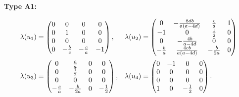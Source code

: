 \documentclass{amsart}
\theoremstyle{plain}
\theoremstyle{remark}
\begin{document}
{\smallskip\noindent
{\bf Type A1:}
{\small
\begin{equation}\label{lambdaA1}
\begin{array}{ll}
\lambda(u_1) = \begin{pmatrix}
0 & 0 & 0 & 0\\
0 & 1 & 0 & 0\\
0 & 0 & 0 & 0\\
0 & -\frac{b}{c} & -\frac{c}{a} & -1
\end{pmatrix}, & \lambda(u_2) = \begin{pmatrix}
0 & -\frac{8db}{a(a-4d)} & \frac{c}{a} & 1\\
-1 & 0 & \frac{1}{2} & 0\\
0 & -\frac{4b}{a-4d} & 0 & 0\\
-\frac{b}{a} & \frac{4cb}{a(a-4d)} & -\frac{b}{2a} & 0\\
\end{pmatrix} \vspace{2mm}
\\

\lambda(u_3) = \begin{pmatrix}
0 & \frac{c}{a} & 0 & 0\\
0 & \frac{1}{2} & 0 & 0\\
0 & 0 & 0 & 0\\
-\frac{c}{a} & -\frac{b}{2a} & 0 & -\frac{1}{2}
\end{pmatrix}, & \lambda(u_4) =\begin{pmatrix}
0 & -1 & 0 & 0\\
0 & 0 & 0 & 0\\
0 & 0 & 0 & 0\\
1 & 0 & -\frac{1}{2} & 0
\end{pmatrix}.
\end{array}
\end{equation}


}}
\end{document}
